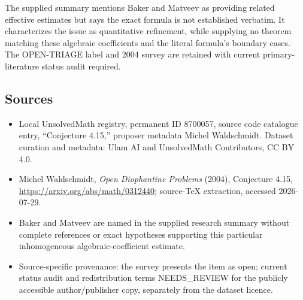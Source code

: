 \documentclass[11pt]{article}
\begin{document}
The supplied summary mentions Baker and Matveev as providing related effective estimates but says the exact formula is not established verbatim. It characterizes the issue as quantitative refinement, while supplying no theorem matching these algebraic coefficients and the literal formula's boundary cases. The OPEN-TRIAGE label and 2004 survey are retained with current primary-literature status audit required.
\subsection{Sources}
\begin{itemize}
\item Local UnsolvedMath registry, permanent ID 8700057, source code catalogue entry, ``Conjecture 4.15,'' proposer metadata Michel Waldschmidt. Dataset curation and metadata: Ulam AI and UnsolvedMath Contributors, CC BY 4.0.
\item Michel Waldschmidt, \emph{Open Diophantine Problems} (2004), Conjecture 4.15, \url{https://arxiv.org/abs/math/0312440}; source-TeX extraction, accessed 2026-07-29.
\item Baker and Matveev are named in the supplied research summary without complete references or exact hypotheses supporting this particular inhomogeneous algebraic-coefficient estimate.
\item Source-specific provenance: the survey presents the item as open; current status audit and redistribution terms NEEDS\_REVIEW for the publicly accessible author/publisher copy, separately from the dataset licence.
\end{itemize}
\end{document}
